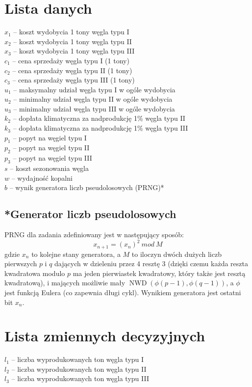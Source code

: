 \documentclass[titlepage]{article}
\begin{document}
\section{Lista danych}
$x_1$ -- koszt wydobycia 1 tony węgla typu I \\
$x_2$ -- koszt wydobycia 1 tony węgla typu II \\
$x_3$ -- koszt wydobycia 1 tony węgla typu III \\
$c_1$ -- cena sprzedaży węgla typu I (1 tony) \\
$c_2$ -- cena sprzedaży węgla typu II (1 tony) \\
$c_3$ -- cena sprzedaży węgla typu III (1 tony) \\
$u_1$ -- maksymalny udział węgla typu I w ogóle wydobycia \\
$u_2$ -- minimalny udział węgla typu II w ogóle wydobycia \\
$u_3$ -- minimalny udział węgla typu III w ogóle wydobycia \\
$k_2$ -- dopłata klimatyczna za nadprodukcję 1\% węgla typu II \\
$k_3$ -- dopłata klimatyczna za nadprodukcję 1\% węgla typu III \\
$p_1$ -- popyt na węgiel typu I \\
$p_2$ -- popyt na węgiel typu II \\
$p_3$ -- popyt na węgiel typu III \\
$s$ -- koszt sezonowania węgla \\
$w$ -- wydajność kopalni \\
$b$ -- wynik generatora liczb pseudolosowych (PRNG)* \\

\subsection{*Generator liczb pseudolosowych}
PRNG dla zadania zdefiniowany jest w następujący sposób:
$$x_{n + 1} = (x_n)^2 \ mod \ M$$
gdzie $x_n$ to kolejne stany generatora, a $M$ to iloczyn dwóch dużych liczb pierwszych $p$ i $q$ dających w dzieleniu przez 4 resztę 3 (dzięki czemu każda reszta kwadratowa modulo $p$ ma jeden pierwiastek kwadratowy,
który także jest resztą kwadratową), i mających możliwie mały $\operatorname{NWD}(\phi(p - 1), \phi(q - 1))$, a $\phi$ jest funkcją Eulera (co zapewnia długi cykl). Wynikiem generatora jest ostatni bit $x_n$.

\section{Lista zmiennych decyzyjnych}
$l_1$ -- liczba wyprodukowanych ton węgla typu I \\
$l_2$ -- liczba wyprodukowanych ton węgla typu II \\
$l_3$ -- liczba wyprodukowanych ton węgla typu III
\end{document}
